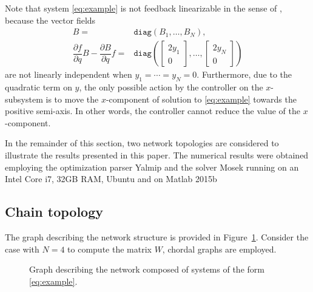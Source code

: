 \documentclass[10pt,twocolumn,twoside]{IEEEtran}
\newcounter{para}
\newcommand\mypara{\par}
\theoremstyle{plain}
\theoremstyle{definition}
\theoremstyle{remark}
\begin{document}
\mypara Note that system \eqref{eq:example} is not feedback linearizable in the sense of \cite{Isidori:1995}, because the vector fields
\begin{align*}
	B=&\mathbin{\mathtt{diag}}(B_1,\ldots,B_N),\\
	\dfrac{\partial f}{\partial q}B-\dfrac{\partial B}{\partial q}f=&\mathbin{\mathtt{diag}}\left(\begin{bmatrix}
	2y_1\\0
	\end{bmatrix},\ldots,\begin{bmatrix}
	2y_N\\0
	\end{bmatrix}\right)
\end{align*}
are not linearly independent when $y_1=\cdots=y_N=0$.  Furthermore, due to the quadratic term on $y$, the only possible action by the controller on the $x$-subsystem is to move the $x$-component of solution to \eqref{eq:example} towards the positive semi-axis. In other words, the controller cannot reduce the value of the $x$-component.

\mypara In the remainder of this section, two network topologies are considered to illustrate the results presented in this paper. The numerical results were obtained employing the optimization parser Yalmip \cite{Loefberg2004,Loefberg2009} and the solver Mosek running on an Intel Core i7, 32GB RAM, Ubuntu and on Matlab 2015b

\subsection{Chain topology}\label{sec:chain topology}

\mypara The graph describing the network structure is provided in Figure~\ref{fig:graph}. Consider the case with $N=4$ to compute the matrix $W$, chordal graphs are employed.

\begin{figure}[htpb!]
	\centering
	
	\caption{Graph describing the network composed of systems of the form \eqref{eq:example}.}
	\label{fig:graph}
\end{figure}
\end{document}
